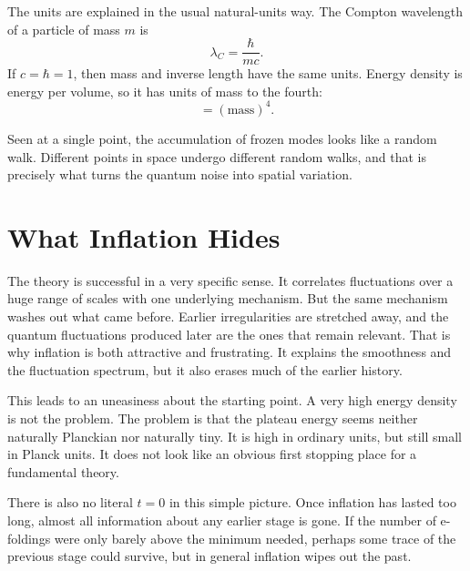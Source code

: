 The units are explained in the usual natural-units way. The Compton wavelength of a particle of mass \(m\) is
\begin{equation}
\lambda_C=\frac{\hbar}{mc}.
\end{equation}
If \(c=\hbar=1\), then mass and inverse length have the same units. Energy density is energy per volume, so it has units of mass to the fourth:
\begin{equation}
[\rho]=(\mathrm{mass})^4.
\end{equation}

Seen at a single point, the accumulation of frozen modes looks like a random walk. Different points in space undergo different random walks, and that is precisely what turns the quantum noise into spatial variation.

\begin{classroomqa}
\end{classroomqa}

\section{What Inflation Hides}

The theory is successful in a very specific sense. It correlates fluctuations over a huge range of scales with one underlying mechanism. But the same mechanism washes out what came before. Earlier irregularities are stretched away, and the quantum fluctuations produced later are the ones that remain relevant. That is why inflation is both attractive and frustrating. It explains the smoothness and the fluctuation spectrum, but it also erases much of the earlier history.

This leads to an uneasiness about the starting point. A very high energy density is not the problem. The problem is that the plateau energy seems neither naturally Planckian nor naturally tiny. It is high in ordinary units, but still small in Planck units. It does not look like an obvious first stopping place for a fundamental theory.

There is also no literal \(t=0\) in this simple picture. Once inflation has lasted too long, almost all information about any earlier stage is gone. If the number of e-foldings were only barely above the minimum needed, perhaps some trace of the previous stage could survive, but in general inflation wipes out the past.

